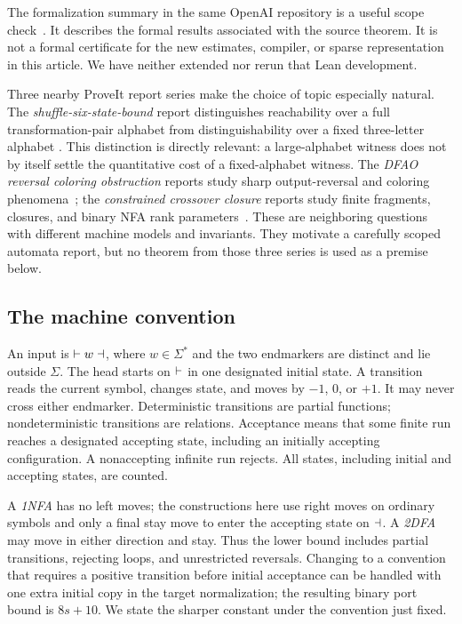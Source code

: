 The formalization summary in the same OpenAI repository is a useful
scope check~\cite{OpenAIFormal129}. It describes the formal results
associated with the source theorem. It is not a formal certificate
for the new estimates, compiler, or sparse representation in this
article. We have neither extended nor rerun that Lean development.

Three nearby ProveIt report series make the choice of topic especially
natural. The \emph{shuffle-six-state-bound} report distinguishes
reachability over a full transformation-pair alphabet from
distinguishability over a fixed three-letter alphabet
\cite{ProveItShuffle}. This distinction is directly relevant: a
large-alphabet witness does not by itself settle the quantitative
cost of a fixed-alphabet witness. The \emph{DFAO reversal coloring
obstruction} reports study sharp output-reversal and coloring
phenomena~\cite{ProveItDFAO}; the \emph{constrained crossover closure}
reports study finite fragments, closures, and binary NFA rank
parameters~\cite{ProveItCrossover}. These are neighboring questions
with different machine models and invariants. They motivate a
carefully scoped automata report, but no theorem from those three
series is used as a premise below.

\subsection{The machine convention}
\label{btc:intro:model}

An input is $\vdash w\dashv$, where $w\in\Sigma^*$ and the two
endmarkers are distinct and lie outside $\Sigma$. The head starts
on $\vdash$ in one designated initial state. A transition reads
the current symbol, changes state, and moves by $-1$, $0$, or $+1$.
It may never cross either endmarker. Deterministic transitions are
partial functions; nondeterministic transitions are relations.
Acceptance means that some finite run reaches a designated accepting
state, including an initially accepting configuration. A nonaccepting
infinite run rejects. All states, including initial and accepting
states, are counted.

A \emph{1NFA} has no left moves; the constructions here use right
moves on ordinary symbols and only a final stay move to enter the
accepting state on $\dashv$. A \emph{2DFA} may move in either direction
and stay. Thus the lower bound includes partial transitions,
rejecting loops, and unrestricted reversals. Changing to a convention
that requires a positive transition before initial acceptance can be
handled with one extra initial copy in the target normalization;
the resulting binary port bound is $8s+10$. We state the sharper
constant under the convention just fixed.


